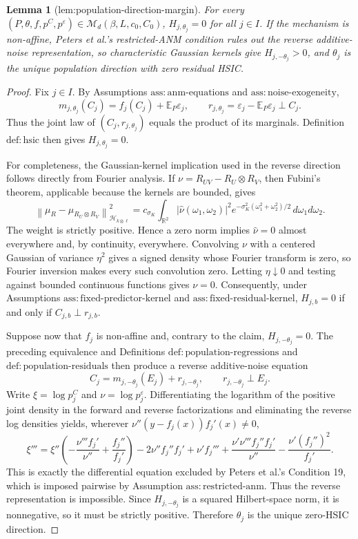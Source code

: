 \documentclass{article}
\newtheorem{lemma}{Lemma}
\begin{document}
\begin{lemma}[lem:population-direction-margin]\label{lem:population-direction-margin}
For every \((P,\theta,f,p^C,p^\varepsilon)\in\mathcal M_d(\beta,L,c_0,C_0)\), \(H_{j,\theta_j}=0\) for all \(j\in I\). If the mechanism is non-affine, Peters et al.'s restricted-ANM condition rules out the reverse additive-noise representation, so characteristic Gaussian kernels give \(H_{j,-\theta_j}>0\), and \(\theta_j\) is the unique population direction with zero residual HSIC.
\end{lemma}
\begin{proof}
Fix \(j\in I\).  By Assumptions \(\mathrm{ass:anm\text{-}equations}\) and \(\mathrm{ass:noise\text{-}exogeneity}\),
\[
m_{j,\theta_j}(C_j)=f_j(C_j)+\mathbb E_P\varepsilon_j,
\qquad
r_{j,\theta_j}=\varepsilon_j-\mathbb E_P\varepsilon_j\perp C_j.
\]
Thus the joint law of \((C_j,r_{j,\theta_j})\) equals the product of its marginals.  Definition \(\mathrm{def:hsic}\) then gives \(H_{j,\theta_j}=0\).

For completeness, the Gaussian-kernel implication used in the reverse direction follows directly from Fourier analysis.  If \(\nu=R_{UV}-R_U\otimes R_V\), then Fubini's theorem, applicable because the kernels are bounded, gives
\[
\left\|\mu_R-\mu_{R_U\otimes R_V}\right\|_{\mathcal H_{k\otimes\ell}}^2
=c_{\sigma_K}\int_{\mathbb R^2}|\widehat\nu(\omega_1,\omega_2)|^2
e^{-\sigma_K^2(\omega_1^2+\omega_2^2)/2}\,d\omega_1d\omega_2.
\]
The weight is strictly positive.  Hence a zero norm implies \(\widehat\nu=0\) almost everywhere and, by continuity, everywhere.  Convolving \(\nu\) with a centered Gaussian of variance \(\eta^2\) gives a signed density whose Fourier transform is zero, so Fourier inversion makes every such convolution zero.  Letting \(\eta\downarrow0\) and testing against bounded continuous functions gives \(\nu=0\).  Consequently, under Assumptions \(\mathrm{ass:fixed\text{-}predictor\text{-}kernel}\) and \(\mathrm{ass:fixed\text{-}residual\text{-}kernel}\), \(H_{j,b}=0\) if and only if \(C_{j,b}\perp r_{j,b}\).

Suppose now that \(f_j\) is non-affine and, contrary to the claim, \(H_{j,-\theta_j}=0\).  The preceding equivalence and Definitions \(\mathrm{def:population\text{-}regressions}\) and \(\mathrm{def:population\text{-}residuals}\) then produce a reverse additive-noise equation
\[
C_j=m_{j,-\theta_j}(E_j)+r_{j,-\theta_j},
\qquad r_{j,-\theta_j}\perp E_j.
\]
Write \(\xi=\log p_j^C\) and \(\nu=\log p_j^\varepsilon\).  Differentiating the logarithm of the positive joint density in the forward and reverse factorizations and eliminating the reverse log densities yields, wherever \(\nu''(y-f_j(x))f_j'(x)\ne0\),
\[
\xi'''=\xi''\left(-\frac{\nu'''f_j'}{\nu''}+\frac{f_j''}{f_j'}\right)
-2\nu''f_j''f_j'+\nu'f_j'''
+\frac{\nu'\nu'''f_j''f_j'}{\nu''}
-\frac{\nu'(f_j'')^2}{f_j'}.
\]
This is exactly the differential equation excluded by Peters et al.'s Condition 19, which is imposed pairwise by Assumption \(\mathrm{ass:restricted\text{-}anm}\).  Thus the reverse representation is impossible.  Since \(H_{j,-\theta_j}\) is a squared Hilbert-space norm, it is nonnegative, so it must be strictly positive.  Therefore \(\theta_j\) is the unique zero-HSIC direction.
\end{proof}
\end{document}
